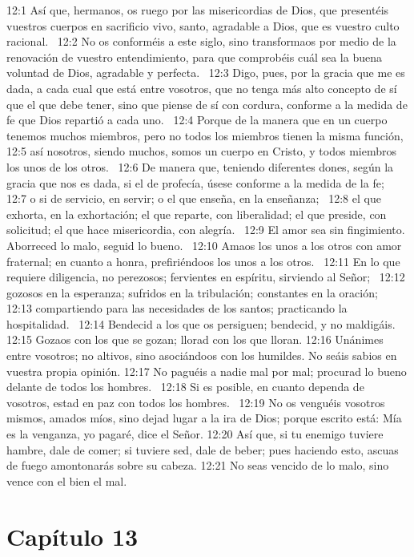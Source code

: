 12:1 Así que, hermanos, os ruego por las misericordias de Dios, que presentéis vuestros cuerpos en sacrificio vivo, santo, agradable a Dios, que es vuestro culto racional.  
12:2 No os conforméis a este siglo, sino transformaos por medio de la renovación de vuestro entendimiento, para que comprobéis cuál sea la buena voluntad de Dios, agradable y perfecta.  
12:3 Digo, pues, por la gracia que me es dada, a cada cual que está entre vosotros, que no tenga más alto concepto de sí que el que debe tener, sino que piense de sí con cordura, conforme a la medida de fe que Dios repartió a cada uno.  
12:4 Porque de la manera que en un cuerpo tenemos muchos miembros, pero no todos los miembros tienen la misma función,  
12:5 así nosotros, siendo muchos, somos un cuerpo en Cristo, y todos miembros los unos de los otros.  
12:6 De manera que, teniendo diferentes dones, según la gracia que nos es dada, si el de profecía, úsese conforme a la medida de la fe;  
12:7 o si de servicio, en servir; o el que enseña, en la enseñanza;  
12:8 el que exhorta, en la exhortación; el que reparte, con liberalidad; el que preside, con solicitud; el que hace misericordia, con alegría.  
12:9 El amor sea sin fingimiento. Aborreced lo malo, seguid lo bueno.  
12:10 Amaos los unos a los otros con amor fraternal; en cuanto a honra, prefiriéndoos los unos a los otros.  
12:11 En lo que requiere diligencia, no perezosos; fervientes en espíritu, sirviendo al Señor;  
12:12 gozosos en la esperanza; sufridos en la tribulación; constantes en la oración;  
12:13 compartiendo para las necesidades de los santos; practicando la hospitalidad.  
12:14 Bendecid a los que os persiguen; bendecid, y no maldigáis.  
12:15 Gozaos con los que se gozan; llorad con los que lloran. 
12:16 Unánimes entre vosotros; no altivos, sino asociándoos con los humildes. No seáis sabios en vuestra propia opinión. 
12:17 No paguéis a nadie mal por mal; procurad lo bueno delante de todos los hombres.  
12:18 Si es posible, en cuanto dependa de vosotros, estad en paz con todos los hombres.  
12:19 No os venguéis vosotros mismos, amados míos, sino dejad lugar a la ira de Dios; porque escrito está: Mía es la venganza, yo pagaré, dice el Señor. 
12:20 Así que, si tu enemigo tuviere hambre, dale de comer; si tuviere sed, dale de beber; pues haciendo esto, ascuas de fuego amontonarás sobre su cabeza. 
12:21 No seas vencido de lo malo, sino vence con el bien el mal.  
\section*{Capítulo 13}

